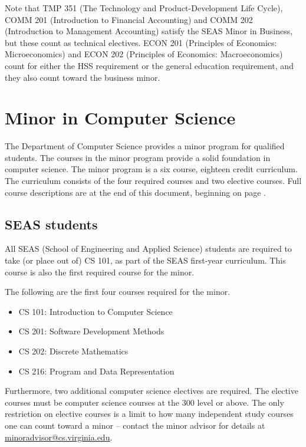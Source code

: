 \documentclass[12pt,twoside]{article}
\newenvironment{itemlist}{
\begin{itemize}
\setlength{\itemsep}{0pt}
\setlength{\parskip}{0pt}}
{\end{itemize}}
\begin{document}
Note that TMP 351 (The Technology and Product-Development Life Cycle),
COMM 201 (Introduction to Financial Accounting) and COMM 202
(Introduction to Management Accounting) satisfy the SEAS Minor in
Business, but these count as technical electives.  ECON 201
(Principles of Economics: Microeconomics) and ECON 202 (Principles of
Economics: Macroeconomics) count for either the HSS requirement or the
general education requirement, and they also count toward the
business minor.




\section{Minor in Computer Science}
\label{minorreqs}

The Department of Computer Science provides a minor program for
qualified students. The courses in the minor program provide a solid
foundation in computer science. The minor program is a six course,
eighteen credit curriculum. The curriculum consists of the four
required courses and two elective courses.  Full course descriptions
are at the end of this document, beginning on page
\pageref{coursedescriptions}.

\subsection{SEAS students}

All SEAS (School of Engineering and Applied Science) students are
required to take (or place out of) CS 101, as part of the SEAS
first-year curriculum.  This course is also the first required course
for the minor.

The following are the first four courses required for the minor.

\begin{itemlist}
\item CS 101: Introduction to Computer Science
\item CS 201: Software Development Methods
\item CS 202: Discrete Mathematics
\item CS 216: Program and Data Representation
\end{itemlist}

Furthermore, two additional computer science electives are
required. The elective courses must be computer science courses at the
300 level or above.  The only restriction on elective courses is a
limit to how many independent study courses one can count toward a
minor -- contact the minor advisor for details at
\url{minoradvisor@cs.virginia.edu}.
\end{document}
